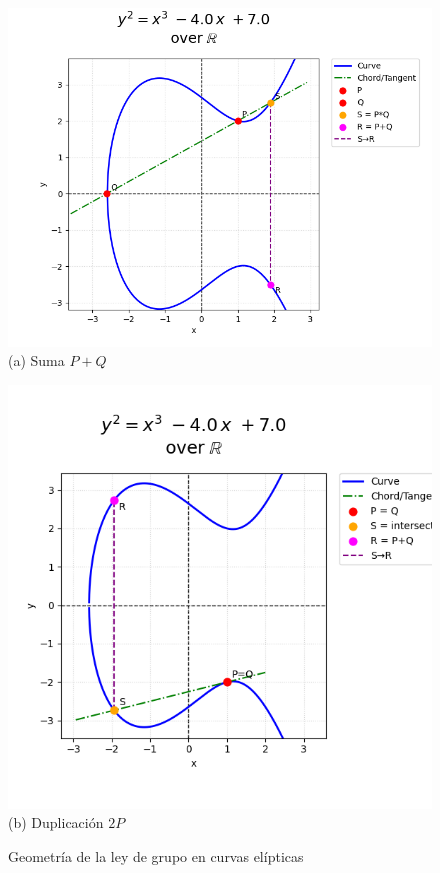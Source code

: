 \begin{figure}[H]
  \centering
  \begin{minipage}{0.5\textwidth}
    \centering
    \includegraphics[width=\textwidth]{imagenes/elliptic_curve2D_addition_example.png}\\
    (a) Suma \(P+Q\)
  \end{minipage}\hfill
  \begin{minipage}{0.5\textwidth}
    \centering
    \includegraphics[width=\textwidth]{imagenes/elliptic_curve_same_addition_example.png}\\
    (b) Duplicación \(2P\)
  \end{minipage}
  \caption{Geometría de la ley de grupo en curvas elípticas}
  \label{fig:grupo_elipticas}
\end{figure}

